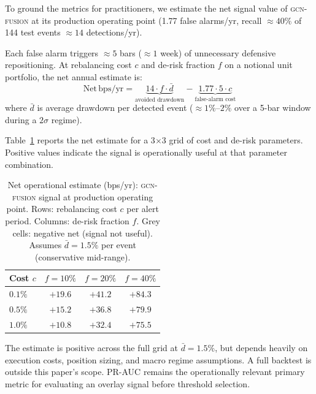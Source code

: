 \documentclass[sigconf]{acmart}
\begin{document}
To ground the metrics for practitioners, we estimate the net signal value
of \textsc{gcn-fusion} at its production operating point (1.77 false alarms/yr,
recall $\approx 40\%$ of 144 test events $\approx 14$ detections/yr).

Each false alarm triggers $\approx 5$ bars ($\approx 1$ week) of unnecessary
defensive repositioning. At rebalancing cost $c$ and de-risk fraction $f$
on a notional unit portfolio, the net annual estimate is:
%
\begin{equation}
\mathrm{Net}\,\mathrm{bps/yr}
  = \underbrace{14 \cdot f \cdot \bar{d}}_{\text{avoided drawdown}}
  - \underbrace{1.77 \cdot 5 \cdot c}_{\text{false-alarm cost}}
\end{equation}
%
where $\bar{d}$ is average drawdown per detected event ($\approx 1\%$--$2\%$
over a 5-bar window during a $2\sigma$ regime).

Table~\ref{tab:operational} reports the net estimate for a 3$\times$3 grid
of cost and de-risk parameters. Positive values indicate the signal is
operationally useful at that parameter combination.

\begin{table}[h]
\caption{Net operational estimate (bps/yr): \textsc{gcn-fusion} signal at
production operating point. Rows: rebalancing cost $c$ per alert period.
Columns: de-risk fraction $f$. Grey cells: negative net (signal not useful).
Assumes $\bar{d} = 1.5\%$ per event (conservative mid-range).}
\label{tab:operational}
\small
\begin{tabular}{@{}lccc@{}}
\toprule
Cost $c$ & $f{=}10\%$ & $f{=}20\%$ & $f{=}40\%$ \\
\midrule
$0.1\%$ & $+19.6$ & $+41.2$ & $+84.3$ \\
$0.5\%$ & $+15.2$ & $+36.8$ & $+79.9$ \\
$1.0\%$ & $+10.8$ & $+32.4$ & $+75.5$ \\
\bottomrule
\end{tabular}
\end{table}

\noindent The estimate is positive across the full grid at $\bar{d} = 1.5\%$,
but depends heavily on execution costs, position sizing, and macro regime
assumptions. A full backtest is outside this paper's scope.
PR-AUC remains the operationally relevant primary metric for evaluating an
overlay signal before threshold selection.



\end{document}
